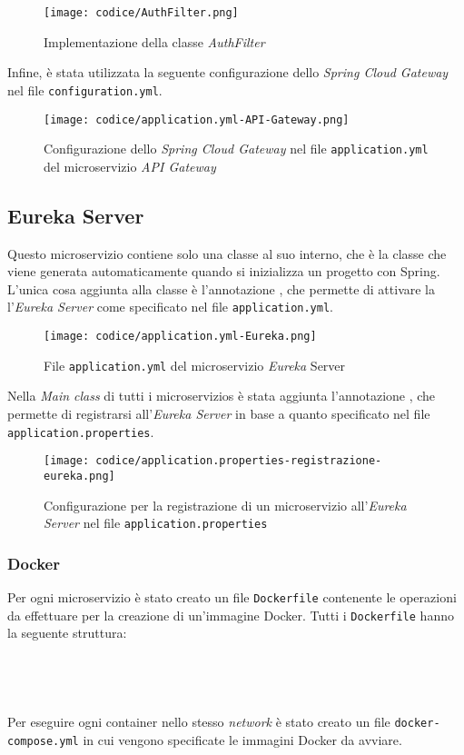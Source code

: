 \begin{figure}[H] 
    \centerline{\texttt{[image: codice/AuthFilter.png]}}
    \caption{Implementazione della classe \textit{AuthFilter}}
\end{figure}
\noindent Infine, è stata utilizzata la seguente configurazione dello \textit{Spring Cloud Gateway} nel file \texttt{configuration.yml}.
\begin{figure}[H] 
    \centering
    \texttt{[image: codice/application.yml-API-Gateway.png]} 
    \caption{Configurazione dello \textit{Spring Cloud Gateway} nel file \texttt{application.yml} del microservizio \textit{API Gateway}}
\end{figure}

\subsection{Eureka Server}
Questo \gls{microservizio} contiene solo una classe al suo interno, che è la classe che viene generata automaticamente quando si inizializza un progetto con Spring. L'unica cosa aggiunta alla classe è l'annotazione , che permette di  attivare la l'\textit{Eureka Server} come specificato nel file \texttt{application.yml}.
\begin{figure}[H] 
    \centering
    \texttt{[image: codice/application.yml-Eureka.png]} 
    \caption{File \texttt{application.yml} del microservizio \textit{Eureka} Server}
\end{figure}
\noindent Nella \textit{Main class} di tutti i \glspl{microservizio}  è stata aggiunta l'annotazione , che permette di registrarsi all'\textit{Eureka Server} in base a quanto specificato nel file \texttt{application.properties}.\\
\begin{figure}[H] 
    \centering
    \texttt{[image: codice/application.properties-registrazione-eureka.png]} 
    \caption{Configurazione per la registrazione di un microservizio all'\textit{Eureka Server} nel file \texttt{application.properties}}
\end{figure}

\subsubsection{Docker}
Per ogni \gls{microservizio} è stato creato un file \texttt{Dockerfile} contenente le operazioni da effettuare per la creazione di un'immagine Docker.
Tutti i \texttt{Dockerfile} hanno la seguente struttura:
\vspace{4pt}\\
\\
\\
\\
\vspace{4pt}\\
Per eseguire ogni \gls{container} nello stesso \textit{network} è stato creato un file \texttt{docker-compose.yml} in cui vengono specificate le immagini Docker da avviare. 
